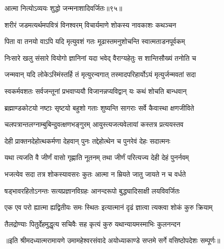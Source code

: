 


{आत्मा नित्योऽव्ययः शुद्धो जन्मनाशादिवर्जितः॥९५॥} %
\addtocounter{shlokacount}{95}

\twolineshloka
{शरीरं जडमत्यर्थमपवित्रं विनश्वरम्}
{विचार्यमाणे शोकस्य नावकाशः कथञ्चन} %

\twolineshloka
{पिता वा तनयो वाऽपि यदि मृत्युवशं गतः}
{मूढास्तमनुशोचन्ति स्वात्मताडनपूर्वकम्} %

\twolineshloka
{निःसारे खलु संसारे वियोगो ज्ञानिनां यदा}
{भवेद् वैराग्यहेतुः स शान्तिसौख्यं तनोति च} %

\twolineshloka
{जन्मवान् यदि लोकेऽस्मिंस्तर्हि तं मृत्युरन्वगात्}
{तस्मादपरिहार्योऽयं मृत्युर्जन्मवतां सदा} %

\twolineshloka
{स्वकर्मवशतः सर्वजन्तूनां प्रभवाप्ययौ}
{विजानन्नप्यविद्वान् यः कथं शोचति बान्धवान्} %

\twolineshloka
{ब्रह्माण्डकोटयो नष्टाः सृष्टयो बहुशो गताः}
{शुष्यन्ति सागराः सर्वे कैवास्था क्षणजीविते} %

\twolineshloka
{चलपत्रान्तलग्नाम्बुबिन्दुवत्क्षणभङ्गुरम्}
{आयुस्त्यजत्यवेलायां कस्तत्र प्रत्ययस्तव} %

\twolineshloka
{देही प्राक्तनदेहोत्थकर्मणा देहवान् पुनः}
{तद्देहोत्थेन च पुनरेवं देहः सदात्मनः} %

\twolineshloka
{यथा त्यजति वै जीर्णं वासो गृह्णाति नूतनम्}
{तथा जीर्णं परित्यज्य देही देहं पुनर्नवम्} %

\twolineshloka
{भजत्येव सदा तत्र शोकस्यावसरः कुतः}
{आत्मा न म्रियते जातु जायते न च वर्धते} %

\twolineshloka
{षड्भावरहितोऽनन्तः सत्यप्रज्ञानविग्रहः}
{आनन्दरूपो बुद्ध्यादिसाक्षी लयविवर्जितः} %

\twolineshloka
{एक एव परो ह्यात्मा ह्यद्वितीयः समः स्थितः}
{इत्यात्मानं दृढं ज्ञात्वा त्यक्त्वा शोकं कुरु क्रियाम्} %

\twolineshloka
{तैलद्रोण्याः पितुर्देहमुद्धृत्य सचिवैः सह}
{कृत्यं कुरु यथान्यायमस्माभिः कुलनन्दन} %

{॥इति श्रीमदध्यात्मरामायणे उमामहेश्वरसंवादे
अयोध्याकाण्डे सप्तमे सर्गे  वसिष्ठोपदेशः  सम्पूर्णः॥}
